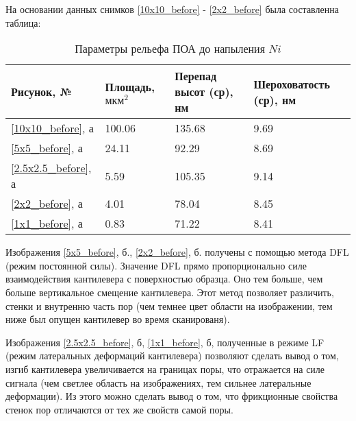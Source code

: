 

\clearpage

На основании данных снимков \ref{10x10_before} - \ref{2x2_before} была составленна таблица:

\begin{table}[H]
    \caption{Параметры рельефа ПОА до напыления $Ni$}\label{table_before}
    \begin{tabular}{|l|l|l|l|}
    \hline Рисунок, № & Площадь, $\text{мкм}^2$ & Перепад высот (ср), нм & Шероховатость  (ср), нм \\
    \hline \ref{10x10_before}, а & 100.06 & 135.68 & 9.69 \\
    \hline \ref{5x5_before}, а & 24.11 & 92.29 & 8.69 \\
    \hline \ref{2.5x2.5_before}, а & 5.59 & 105.35 & 9.14 \\
    \hline \ref{2x2_before}, а & 4.01 & 78.04 & 8.45 \\
    \hline \ref{1x1_before}, а & 0.83 & 71.22 & 8.41 \\
    \hline
    \end{tabular}
\end{table}

Изображения \ref{5x5_before}, б., \ref{2x2_before}, б. получены с помощью метода DFL (режим постоянной силы). Значение DFL прямо пропорционально силе взаимодействия кантилевера с поверхностью образца. Оно тем больше, чем больше вертикальное смещение кантилевера. Этот метод позволяет различить, стенки и внутренню часть пор (чем темнее цвет области на изображении, тем ниже был опущен кантилевер во время сканированя).

Изображения \ref{2.5x2.5_before}, б, \ref{1x1_before}, б, полученные в режиме LF (режим латеральных деформаций кантилевера) позволяют сделать вывод о том, изгиб кантилевера увеличивается на границах поры, что отражается на силе сигнала (чем светлее область на изображениях, тем сильнее латеральные деформации). Из этого можно сделать вывод о том, что фрикционные свойства стенок пор отличаются от тех же свойств самой поры.

